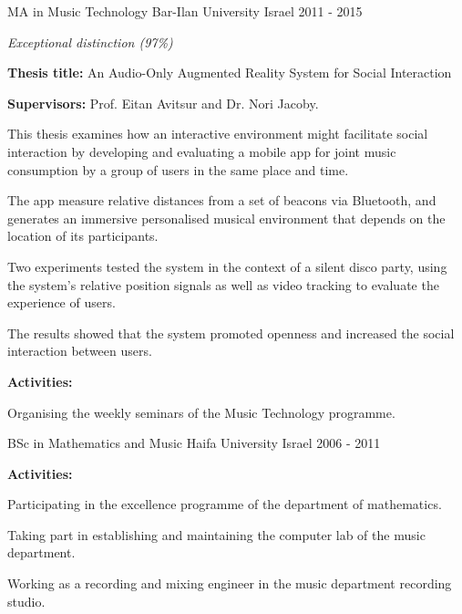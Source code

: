 \documentclass[11pt, a4paper]{awesome-cv}
\begin{document}
\begin{cventries}
  \cventry
    {MA in Music Technology} %
    {Bar-Ilan University} %
    {Israel} %
    {2011 - 2015} %
    {
      \begin{cvitems} %
        \item {\textit{Exceptional distinction (97\%)}}
        \item {\textbf{Thesis title:} An Audio-Only Augmented Reality System for Social Interaction}
        \item {\textbf{Supervisors:} Prof. Eitan Avitsur and Dr. Nori Jacoby.}
        \item {This thesis examines how an interactive environment might facilitate social interaction by developing and evaluating a mobile app for joint music consumption by a group of users in the same place and time.}
        \item {The app measure relative distances from a set of beacons via Bluetooth, and generates an immersive personalised musical environment that depends on the location of its participants.}
        \item {Two experiments tested the system in the context of a silent disco party, using the system's relative position signals as well as video tracking to evaluate the experience of users.}
        \item {The results showed that the system promoted openness and increased the social interaction between users.}
        \item {\textbf{Activities:}}
        \item {Organising the weekly seminars of the Music Technology programme.}
      \end{cvitems}
    }

  \cventry
    {BSc in Mathematics and Music} %
    {Haifa University} %
    {Israel} %
    {2006 - 2011} %
    {
      \begin{cvitems} %
        \item {\textbf{Activities:}}
        \item {Participating in the excellence programme of the department of mathematics.}
        \item {Taking part in establishing and maintaining the computer lab of the music department.}
        \item {Working as a recording and mixing engineer in the music department recording studio.}
      \end{cvitems}
    }

\end{cventries}

\end{document}
